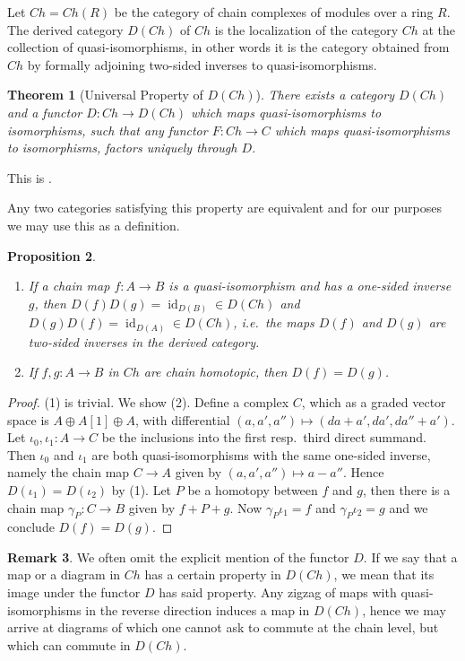 \documentclass{scrartcl}
\theoremstyle{plain}
\newtheorem{theorem}{Theorem}[section]
\newtheorem{proposition}[theorem]{Proposition}
\theoremstyle{definition}
\newtheorem{remark}[theorem]{Remark}
\DeclareMathOperator{\id}{id}
\begin{document}
Let $Ch=Ch(R)$ be the category of chain complexes of modules over a ring $R$. 
The derived category $D(Ch)$ of $Ch$ is the localization of the category $Ch$ at the collection of quasi-isomorphisms, in other words it is the category obtained from $Ch$ by formally adjoining two-sided inverses to quasi-isomorphisms.

\begin{theorem}[Universal Property of $D(Ch)$]\label{thm:derived-universal-prop}
    There exists a category $D(Ch)$ and a functor $D\colon Ch\to D(Ch)$ which maps quasi-isomorphisms to isomorphisms, such that any functor $F\colon Ch\to C$ which maps quasi-isomorphisms to isomorphisms, factors uniquely through $D$.  
\end{theorem}
This is \cite[Thm III.2.1]{gelfand2013methods}.

Any two categories satisfying this property are equivalent and for our purposes we may use this as a definition. 

\begin{proposition}
    \begin{enumerate}[(1)]
        \item If a chain map $f\colon A\to B$ is a quasi-isomorphism and has a one-sided inverse $g$, then $D(f)D(g) = \id_{D(B)}\in D(Ch)$ and $D(g)D(f)=\id_{D(A)}\in D(Ch)$, i.e.\ the maps $D(f)$ and $D(g)$ are two-sided inverses in the derived category.
        \item If $f, g\colon A\to B$ in $Ch$ are chain homotopic, then $D(f) = D(g)$.  
    \end{enumerate}
\end{proposition}
\begin{proof}
    (1) is trivial. We show (2). Define a complex $C$, which as a graded vector space is $A\oplus A[1]\oplus A$, with differential $(a, a', a'')\mapsto (da+a', da', da''+a')$. Let $\iota_{0}, \iota_1\colon A\to C$ be the inclusions into the first resp.\ third direct summand. Then $\iota_0$ and $\iota_1$ are both quasi-isomorphisms with the same one-sided inverse, namely the chain map $C\to A$ given by $(a, a', a'')\mapsto a-a''$. Hence $D(\iota_1) = D(\iota_2)$ by (1). Let $P$ be a homotopy between $f$ and $g$, then there is a chain map $\gamma_P\colon C\to B$ given by $f + P+ g$. Now $\gamma_P\iota_1 = f$ and $\gamma_P\iota_2=g$ and we conclude $D(f) = D(g)$.
\end{proof}

\begin{remark}\label{rmk:derived-notation}
    We often omit the explicit mention of the functor $D$. If we say that a map or a diagram in $Ch$ has a certain property in $D(Ch)$, we mean that its image under the functor $D$ has said property. Any zigzag of maps with quasi-isomorphisms in the reverse direction induces a map in $D(Ch)$, hence we may arrive at diagrams of which one cannot ask to commute at the chain level, but which can commute in $D(Ch)$.
\end{remark}
\end{document}

